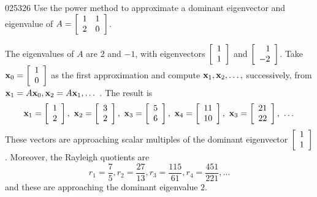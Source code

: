 \begin{example}{}{025326}
Use the power method to approximate a dominant eigenvector and eigenvalue of $A = \left[ \begin{array}{rr}
1 & 1 \\
2 & 0
\end{array}\right]$.


\begin{solution}
  The eigenvalues of $A$ are $2$ and $-1$, with eigenvectors $\left[ \begin{array}{rr}
  1 \\
  1 
  \end{array}\right]$ and $\left[ \begin{array}{rr}
  1 \\
  -2 
  \end{array}\right]$. Take $\textbf{x}_{0} = \left[ \begin{array}{rr}
  1 \\
  0 
  \end{array}\right]$ as the first approximation and compute $\textbf{x}_{1}, \textbf{x}_{2}, \dots,$ successively, from $\textbf{x}_{1} = A\textbf{x}_{0}, \textbf{x}_{2} = A\textbf{x}_{1}, \dots$ . The result is
\begin{equation*}
\textbf{x}_{1} = \left[ \begin{array}{rr}
1 \\
2 
\end{array}\right], \
\textbf{x}_{2} = \left[ \begin{array}{rr}
3 \\
2 
\end{array}\right], \
\textbf{x}_{3} = \left[ \begin{array}{rr}
5 \\
6 
\end{array}\right], \
\textbf{x}_{4} = \left[ \begin{array}{rr}
11 \\
10 
\end{array}\right], \
\textbf{x}_{3} = \left[ \begin{array}{rr}
21 \\
22 
\end{array}\right], \ \dots
\end{equation*}
These vectors are approaching scalar multiples of the dominant eigenvector $\left[ \begin{array}{rr}
1 \\
1 
\end{array}\right]$. Moreover, the Rayleigh quotients are
\begin{equation*}
r_{1} = \frac{7}{5}, r_{2} = \frac{27}{13}, r_{3} = \frac{115}{61}, r_{4} = \frac{451}{221}, \dots
\end{equation*}
and these are approaching the dominant eigenvalue $2$.
\end{solution}
\end{example}

